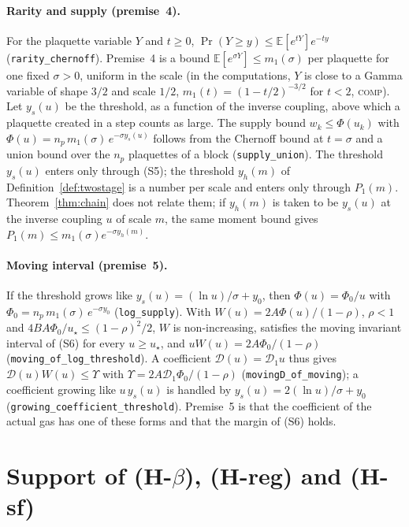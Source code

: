 \documentclass[11pt,a4paper]{article}
\theoremstyle{definition}
\theoremstyle{remark}
\newcommand{\E}{\mathbb{E}}
\newcommand{\tagC}{\textsc{comp}}
\newcommand{\lt}[1]{\texttt{#1}}
\begin{document}
\paragraph{Rarity and supply (premise~4).} For the plaquette variable $Y$ and $t\ge0$, $\Pr(Y\ge y)\le\E[e^{tY}]e^{-ty}$ (\lt{rarity\_\allowbreak{}chernoff}). Premise~4 is a bound $\E[e^{\sigma Y}]\le m_1(\sigma)$ per plaquette for one fixed $\sigma>0$, uniform in the scale (in the computations, $Y$ is close to a Gamma variable of shape $3/2$ and scale $1/2$, $m_1(t)=(1-t/2)^{-3/2}$ for $t<2$, \tagC). Let $y_s(u)$ be the threshold, as a function of the inverse coupling, above which a plaquette created in a step counts as large. The supply bound $w_k\le\Phi(u_k)$ with $\Phi(u)=n_p\,m_1(\sigma)\,e^{-\sigma y_s(u)}$ follows from the Chernoff bound at $t=\sigma$ and a union bound over the $n_p$ plaquettes of a block (\lt{supply\_\allowbreak{}union}). The threshold $y_s(u)$ enters only through (S5); the threshold $y_h(m)$ of Definition~\ref{def:twostage} is a number per scale and enters only through $P_1(m)$. Theorem~\ref{thm:chain} does not relate them; if $y_h(m)$ is taken to be $y_s(u)$ at the inverse coupling $u$ of scale $m$, the same moment bound gives $P_1(m)\le m_1(\sigma)e^{-\sigma y_h(m)}$.

\paragraph{Moving interval (premise~5).} If the threshold grows like $y_s(u)=(\ln u)/\sigma+y_0$, then $\Phi(u)=\Phi_0/u$ with $\Phi_0=n_p\,m_1(\sigma)\,e^{-\sigma y_0}$ (\lt{log\_\allowbreak{}supply}). With $W(u)=2A\Phi(u)/(1-\rho)$, $\rho<1$ and $4BA\Phi_0/u_\star\le(1-\rho)^2/2$, $W$ is non-increasing, satisfies the moving invariant interval of (S6) for every $u\ge u_\star$, and $uW(u)=2A\Phi_0/(1-\rho)$ (\lt{moving\_\allowbreak{}of\_\allowbreak{}log\_\allowbreak{}threshold}). A coefficient $\mathcal D(u)=\mathcal D_1u$ thus gives $\mathcal D(u)W(u)\le\Upsilon$ with $\Upsilon=2A\mathcal D_1\Phi_0/(1-\rho)$ (\lt{movingD\_\allowbreak{}of\_\allowbreak{}moving}); a coefficient growing like $u\,y_s(u)$ is handled by $y_s(u)=2(\ln u)/\sigma+y_0$ (\lt{growing\_\allowbreak{}coefficient\_\allowbreak{}threshold}). Premise~5 is that the coefficient of the actual gas has one of these forms and that the margin of (S6) holds.

\section{Support of (H-\texorpdfstring{$\beta$}{beta}), (H-reg) and (H-sf)}\label{app:support}
\end{document}

